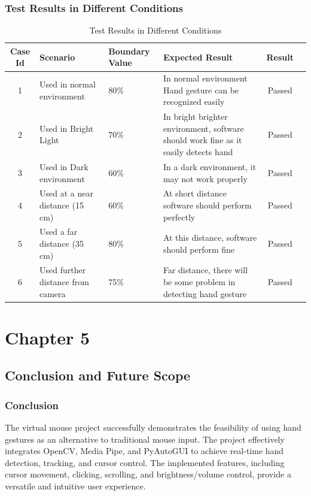 \documentclass[12pt,a4paper]{report}
\begin{document}
	\subsection{Test Results in Different Conditions}{
\begin{table}[h]
    \centering
    \begin{tabular}{|c|p{3cm}|p{1.9cm}|p{5cm}|c|c}
        \hline
        \textbf{Case Id} & \textbf{Scenario} & \textbf{Boundary Value} & \textbf{Expected Result} & \textbf{Result} \\
        \hline
        1 & Used in normal environment & 80\% & In normal environment Hand gesture can be recognized easily & Passed \\
        \hline
        2 & Used in Bright Light & 70\% & In bright brighter environment, software should work fine as it easily detects hand & Passed \\
        \hline
        3 & Used in Dark environment & 60\% & In a dark environment, it may not work properly & Passed \\
        \hline
        4 & Used at a near distance (15 cm) & 60\% & At short distance software should perform perfectly & Passed \\
        \hline
        5 & Used a far distance (35 cm) & 80\% & At this distance, software should perform fine & Passed \\
        \hline
        6 & Used further distance from camera & 75\% & Far distance, there will be some problem in detecting hand gesture & Passed \\
        \hline
    \end{tabular}
    \caption{Test Results in Different Conditions}
    \label{tab:Test Results in Different Conditions}
\end{table}
\thispagestyle{empty}
 \newpage
			{\vfill \chapter*{\centering \vfill Chapter 5 \vfill}\vfill}
		\thispagestyle{empty}
	
	\newpage
	\label{Conclusion and Future Scope}
	\section{Conclusion and Future Scope}
{
	\subsection{Conclusion}	The virtual mouse project successfully demonstrates the feasibility of using hand gestures as an alternative to traditional mouse input. The project effectively integrates OpenCV, Media Pipe, and PyAutoGUI to achieve real-time hand detection, tracking, and cursor control. The implemented features, including cursor movement, clicking, scrolling, and brightness/volume control, provide a versatile and intuitive user experience. 

}}
\end{document}
